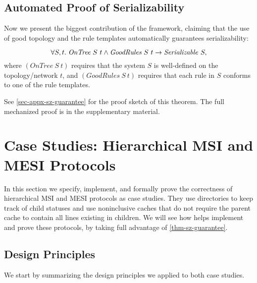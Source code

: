 \documentclass[sigplan,10pt,review,anonymous,screen]{acmart}\settopmatter{printfolios=true,printccs=false,printacmref=false}
\begin{document}
\subsection{Automated Proof of Serializability}


\newcommand{\ontree}[2]{\ensuremath{\textit{OnTree}\ #1\ #2}}
\newcommand{\goodrules}[2]{\ensuremath{\textit{GoodRules}\ #1\ #2}}

Now we present the biggest contribution of the \hemiola{} framework, claiming that the use of good topology and the rule templates automatically guarantees serializability:
\begin{theorem}
  \begin{displaymath}
    \forall S, t.\; \ontree{S}{t} \land \goodrules{S}{t} \to \hsrz{S},
  \end{displaymath}
  where $(\ontree{S}{t})$ requires that the system $S$ is well-defined on the topology/network $t$, and $(\goodrules{S}{t})$ requires that each rule in $S$ conforms to one of the rule templates.
  \label{thm-sz-guarantee}
\end{theorem}
See \autoref{sec-appx-sz-guarantee} for the proof sketch of this theorem.
The full mechanized proof is in the supplementary material.

\section{Case Studies: Hierarchical MSI and MESI Protocols}
\label{sec-case-study}

In this section we specify, implement, and formally prove the correctness of hierarchical MSI and MESI protocols as case studies.
They use directories to keep track of child statuses and use noninclusive caches that do not require the parent cache to contain all lines existing in children.
We will see how \hemiola{} helps implement and prove these protocols, by taking full advantage of \autoref{thm-sz-guarantee}.

\subsection{Design Principles}
We start by summarizing the design principles we applied to both case studies.
\end{document}
